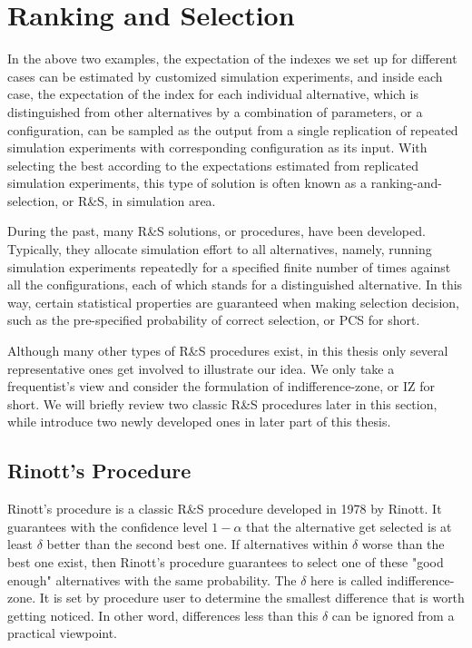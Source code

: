\documentclass[12pt,a4]{report}
\begin{document}
\section{Ranking and Selection}

In the above two examples, the expectation of the indexes we set up for different cases can be estimated by customized simulation experiments, and inside each case, the expectation of the index for each individual alternative, which is distinguished from other alternatives by a combination of parameters, or a configuration, can be sampled as the output from a single replication of repeated simulation experiments with corresponding configuration as its input. With selecting the best according to the expectations estimated from replicated simulation experiments, this type of solution is often known as a ranking-and-selection, or R\&S, in simulation area.

During the past, many R\&S solutions, or procedures, have been developed. Typically, they allocate simulation effort to all alternatives, namely, running simulation experiments repeatedly for a specified finite number of times against all the configurations, each of which stands for a distinguished alternative. In this way, certain statistical properties are guaranteed when making selection decision, such as the pre-specified probability of correct selection, or PCS for short.

Although many other types of R\&S procedures exist, in this thesis only several representative ones get involved to illustrate our idea. We only take a frequentist’s view and consider the formulation of indifference-zone, or IZ for short. We will briefly review two classic R\&S procedures later in this section, while introduce two newly developed ones in later part of this thesis.

\subsection{Rinott's Procedure}

Rinott's procedure is a classic R\&S procedure developed in 1978 by Rinott. It guarantees with the confidence level $1 - \alpha$ that the alternative get selected is at least $\delta$ better than the second best one. If alternatives within $\delta$ worse than the best one exist, then Rinott's procedure guarantees to select one of these "good enough" alternatives with the same probability. The $\delta$ here is called indifference-zone. It is set by procedure user to determine the smallest difference that is worth getting noticed. In other word, differences less than this $\delta$ can be ignored from a practical viewpoint.
\end{document}
